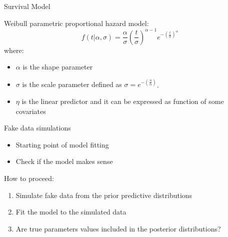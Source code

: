 \documentclass[ignorenonframetext,a4paper]{beamer}
\begin{document}
\begin{frame}{Survival Model}

Weibull parametric proportional hazard model: \[
  f \left( t \vert \alpha, \sigma \right) = \frac{\alpha}{\sigma} \left( \frac{t}{\sigma}\right)^{\alpha - 1} e ^{ - \left( \frac{t}{\sigma} \right)^{\alpha} }
  \] where:

\begin{itemize}
 \item{$\alpha$ is the shape parameter}
 \item{$\sigma$ is the scale parameter defined as $\sigma = e ^{ - \left( \frac{\eta}{\alpha} \right) }$}.
 \item{$\eta$ is the linear predictor and it can be expressed as 
       function of some covariates}
\end{itemize}

\end{frame}

\begin{frame}{Fake data simulations}

\begin{itemize}
  \item{Starting point of model fitting}
  \item{Check if the model makes sense}
\end{itemize}

How to proceed:

\begin{enumerate}
  \item{Simulate fake data from the prior predictive distributions}
  \item{Fit the model to the simulated data}
  \item{Are true parameters values included in the posterior 
        distributions?}
\end{enumerate}

\end{frame}
\end{document}

